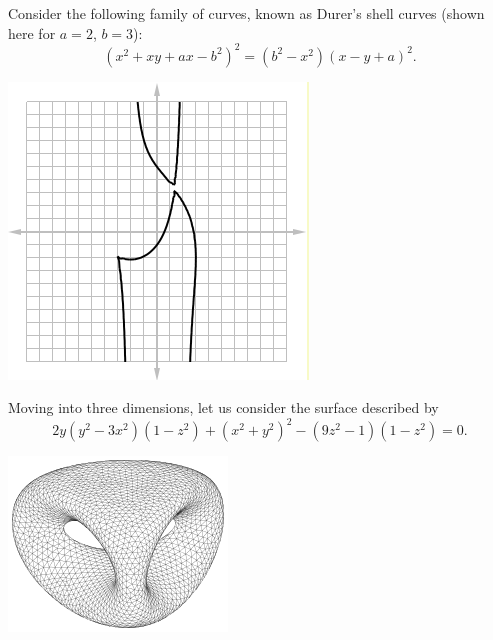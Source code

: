 \begin{questions}
  \clearpage
  \questioS Consider the following family of curves, known as Durer's shell curves (shown here for $ a = 2 $, $ b = 3 $):
            \begin{displaymath}
              (x^2 + xy + ax - b^2)^2 = (b^2 - x^2)(x - y + a)^2.
            \end{displaymath}
            \begin{center}
              \includegraphics[width=0.3\linewidth]{durer}
            \end{center}
  \questioO Moving into three dimensions, let us consider the surface described by
            \begin{displaymath}
              2y(y^2 - 3x^2)(1 - z^2) + (x^2 + y^2)^2 - (9z^2 - 1)(1 - z^2) = 0.
            \end{displaymath}
            \begin{center}
              \includegraphics[width=0.3\linewidth]{impsurface}
            \end{center}
    \begin{parts}

\end{parts}
\end{questions}
